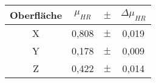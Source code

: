 \begin{tabular}{c|ccc}
    Oberfläche & $\mu_{HR}$ & $\pm$ & $\Delta \mu_{HR}$ \\ \hline
    X & 0,808 & $\pm$ & 0,019 \\
    Y & 0,178 & $\pm$ & 0,009 \\
    Z & 0,422 & $\pm$ & 0,014
\end{tabular}